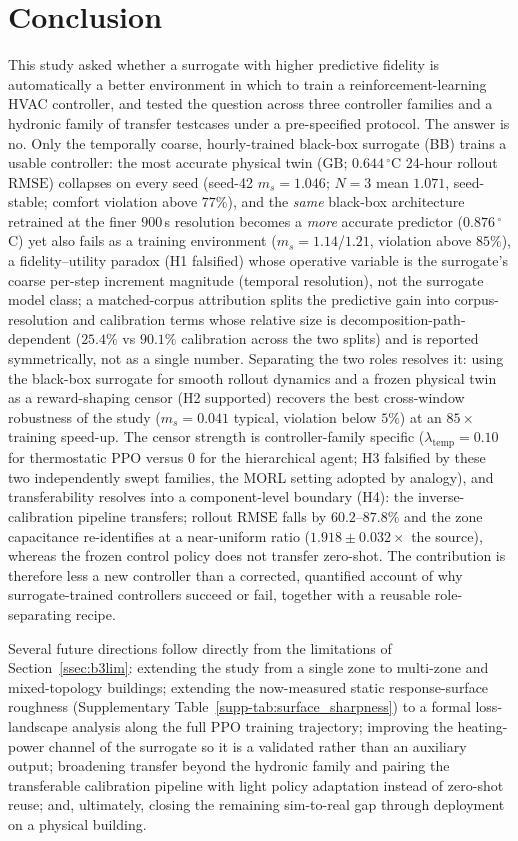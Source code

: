 \documentclass[a4paper,fleqn]{cas-sc}
\newcommand{\RMSE}{\ensuremath{\mathrm{RMSE}}}
\newcommand{\suppref}[1]{\ref{supp-#1}}
\begin{document}
\section{Conclusion}\label{sec:conclusion}
This study asked whether a surrogate with higher predictive fidelity is automatically a
better environment in which to train a reinforcement-learning HVAC controller, and
tested the question across three controller families and a hydronic family of
transfer testcases under a pre-specified protocol. The answer is
no. Only the temporally coarse, hourly-trained black-box surrogate (BB) trains a
usable controller: the most accurate physical twin (GB; $0.644\,^{\circ}$C 24-hour
rollout \RMSE) collapses on every seed (seed-42 $m_s = 1.046$; $N=3$ mean $1.071$, seed-stable; comfort violation above $77\%$), and the
\emph{same} black-box architecture retrained at the finer $900$\,s resolution becomes
a \emph{more} accurate predictor ($0.876\,^{\circ}$C) yet also fails as a training
environment ($m_s = 1.14$/$1.21$, violation above $85\%$), a fidelity--utility
paradox (H1 falsified) whose operative variable is the surrogate's coarse per-step
increment magnitude (temporal resolution), not the surrogate model class; a matched-corpus
attribution splits the predictive gain into corpus-resolution and calibration terms whose
relative size is decomposition-path-dependent ($25.4\%$ vs $90.1\%$ calibration across the two splits) and is reported symmetrically, not as a single number. Separating the two roles resolves it: using the
black-box surrogate for smooth rollout dynamics and a frozen physical twin as a
reward-shaping censor (H2 supported) recovers the best cross-window robustness of the
study ($m_s = 0.041$ typical, violation below $5\%$) at an $85\times$ training
speed-up. The censor strength is controller-family specific
($\lambda_{\mathrm{temp}}=0.10$ for thermostatic PPO versus $0$ for the hierarchical
agent; H3 falsified by these two independently swept families, the MORL setting adopted by analogy), and transferability resolves into a component-level
boundary (H4): the inverse-calibration pipeline transfers; rollout \RMSE{} falls
by $60.2$--$87.8\%$ and the zone capacitance re-identifies at a near-uniform
ratio ($1.918\pm0.032\times$ the source), whereas the frozen control policy
does not transfer zero-shot. The contribution is therefore less a new controller
than a corrected, quantified account of why surrogate-trained controllers succeed
or fail, together with a reusable role-separating recipe.

Several future directions follow directly from the limitations of
Section~\ref{ssec:b3lim}: extending the study from a single zone to multi-zone and
mixed-topology buildings; extending the now-measured static response-surface
roughness (Supplementary Table~\suppref{tab:surface_sharpness}) to a formal loss-landscape analysis
along the full PPO training trajectory;
improving the heating-power channel of the surrogate so it is a validated rather
than an auxiliary output; broadening transfer beyond the hydronic family and
pairing the transferable calibration pipeline with light policy adaptation instead
of zero-shot reuse; and, ultimately, closing the remaining sim-to-real gap through
deployment on a physical building.
\end{document}
